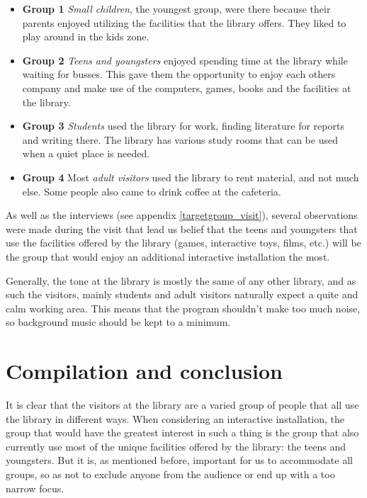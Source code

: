 \begin{itemize}

\item \textbf{Group 1} \textit{Small children}, the youngest group, were there because their parents enjoyed utilizing the facilities that the library offers. They liked to play around in the kids zone.

\item \textbf{Group 2} \textit{Teens and youngsters} enjoyed spending time at the library while waiting for busses. This gave them the opportunity to enjoy each others company and make use of the computers, games, books and the facilities at the library.

\item \textbf{Group 3} \textit{Students} used the library for work, finding literature for reports and writing there. The library has various study rooms that can be used when a quiet place is needed.

\item \textbf{Group 4} Most \textit{adult visitors} used the library to rent material, and not much else. Some people also came to drink coffee at the cafeteria.

\end{itemize}

As well as the interviews (see appendix \ref{targetgroup_visit}), several observations were made during the visit that lead us belief that the teens and youngsters that use the facilities offered by the library (games, interactive toys, films, etc.) will be the group that would enjoy an additional interactive installation the most.

Generally, the tone at the library is mostly the same of any other library, and as such the visitors, mainly students and adult visitors naturally expect a quite and calm working area. This means that the program shouldn't make too much noise, so background music should be kept to a minimum.

\section{Compilation and conclusion}

It is clear that the visitors at the library are a varied group of people that all use the library in different ways. When considering an interactive installation, the group that would have the greatest interest in such a thing is the group that also currently use most of the unique facilities offered by the library: the teens and youngsters. But it is, as mentioned before, important for us to accommodate all groups, so as not to exclude anyone from the audience or end up with a too narrow focus.

